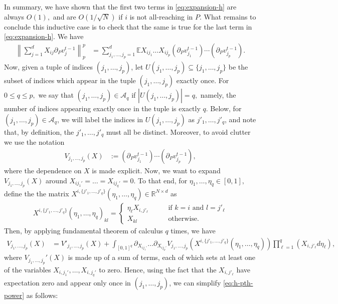 \documentclass{article}
\newcommand{\1}{\mathbbm{1}}
\newcommand{\norm}[1]{\left\lVert#1\right\rVert}
\theoremstyle{plain}
\theoremstyle{definition}
\theoremstyle{remark}
\newcommand{\E}{\mathbb{E}}
\newcommand{\calA}{\mathcal{A}}
\newcommand{\R}{\mathbb{R}}
\begin{document}
In summary, we have shown that the first two terms in \eqref{eq:expansion-h} are always $O(1),$ and are $O(1/\sqrt{N})$ if $i$ is not all-reaching in $P.$ What remains to conclude this inductive case is to check that the same is true for the last term in \eqref{eq:expansion-h}. We have
\begin{align}
    \norm{\sum_{j=1}^d X_{ij}\partial_P v_j^{t-1}}_p^p &= \sum_{j_1,\dots,j_p=1}^d \E X_{ij_1}\dots X_{ij_p} (\partial_Pv_{j_1}^{t-1}) \cdots (\partial_Pv_{j_p}^{t-1}) .\label{eq:h-pth-power}
\end{align}
   Now, given a tuple of indices $(j_1,\dots,j_p)$, let $U(j_1,\dots,j_p)\subseteq \{j_1,\dots,j_p\}$ be the subset of indices which appear in the tuple $(j_1,\dots,j_p)$ exactly once. For $0\leq q\leq p,$ we say that $(j_1,\dots,j_p) \in \calA_q$ if $|U(j_1,\dots,j_p)|=q,$ namely, the number of indices appearing exactly once in the tuple is exactly $q.$ Below, for $(j_1,\dots,j_p) \in \calA_q$, we will label the indices in $U(j_1,\dots,j_p)$ as $j'_1,\dots,j'_q$, and note that, by definition, the $j'_1,\dots,j'_q$ must all be distinct. Moreover, to avoid clutter we use the notation 
\begin{align}\label{eq:V-expansion}
    V_{j_1,\dots,j_p}(X) &:= (\partial_Pv_{j_1}^{t-1}) \cdots (\partial_Pv_{j_p}^{t-1}),
\end{align}
where the dependence on $X$ is made explicit. Now, we want to expand $V_{j_1,\dots,j_p}(X)$ around $X_{ij_1'}=\dots=X_{ij_q'}=0.$ To that end, for $\eta_1,\dots,\eta_q\in [0,1],$ define the the matrix $X^{i,\{j'_1,\dots,j'_q\}}(\eta_1,\dots,\eta_q) \in \R^{N\times d}$ as 
\begin{align}
    X^{i,\{j'_1,\dots,j'_q\}}(\eta_1,\dots,\eta_q)_{kl} = \begin{cases}
    \eta_\ell X_{i,j'_\ell}\qquad &\text{if }k =i\text{ and }l=j'_\ell \\
    X_{kl} & \text{otherwise.}
\end{cases}\label{eq:X-prime-expansion}
\end{align}
Then, by applying fundamental theorem of calculus $q$ times, we have 
\begin{align}
    V_{j_1,\dots,j_p}(X) &= V'_{j_1,\dots,j_p}(X) + \int_{[0,1]^q}  \partial_{X_{ij_1'}}\dots \partial_{X_{ij_p'}}V_{j_1,\dots,j_p}(X^{i,\{j'_1,\dots,j'_q\}}(\eta_1,\dots,\eta_q))\prod_{\ell=1}^q (X_{i,j'_\ell}d\eta_\ell), \label{eq:V-FTC}
\end{align}
where $V_{j_1,\dots,j_p}'(X)$ is made up of a sum of terms, each of which sets at least one of the variables $X_{i,j_1'},\dots,X_{i,j_q'}$ to zero. Hence, using the fact that the $X_{i,j'_\ell}$ have expectation zero and appear only once in $(j_1,\dots,j_p)$, we can simplify \eqref{eq:h-pth-power} as follows:
\end{document}
